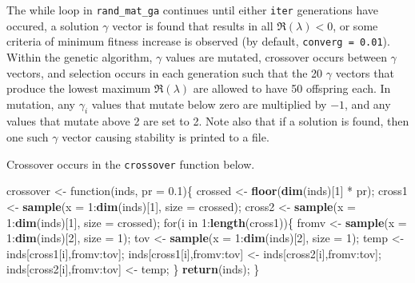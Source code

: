 \documentclass[]{article}
\newenvironment{Shaded}{\begin{snugshade}}{\end{snugshade}}
\newcommand{\KeywordTok}[1]{\textcolor[rgb]{0.13,0.29,0.53}{\textbf{{#1}}}}
\newcommand{\DataTypeTok}[1]{\textcolor[rgb]{0.13,0.29,0.53}{{#1}}}
\newcommand{\DecValTok}[1]{\textcolor[rgb]{0.00,0.00,0.81}{{#1}}}
\newcommand{\FloatTok}[1]{\textcolor[rgb]{0.00,0.00,0.81}{{#1}}}
\newcommand{\StringTok}[1]{\textcolor[rgb]{0.31,0.60,0.02}{{#1}}}
\newcommand{\NormalTok}[1]{{#1}}
\begin{document}
The while loop in \texttt{rand\_mat\_ga} continues until either
\texttt{iter} generations have occured, a solution \(\gamma\) vector is
found that results in all \(\Re(\lambda) < 0\), or some criteria of
minimum fitness increase is observed (by default,
\texttt{converg\ =\ 0.01}). Within the genetic algorithm, \(\gamma\)
values are mutated, crossover occurs between \(\gamma\) vectors, and
selection occurs in each generation such that the 20 \(\gamma\) vectors
that produce the lowest maximum \(\Re(\lambda)\) are allowed to have 50
offspring each. In mutation, any \(\gamma_{i}\) values that mutate below
zero are multiplied by \(-1\), and any values that mutate above 2 are
set to 2. Note also that if a solution is found, then one such
\(\gamma\) vector causing stability is printed to a file.

Crossover occurs in the \texttt{crossover} function below.

\begin{Shaded}
\begin{Highlighting}[]
\NormalTok{crossover <-}\StringTok{ }\NormalTok{function(inds, }\DataTypeTok{pr =} \FloatTok{0.1}\NormalTok{)\{}
    \NormalTok{crossed <-}\StringTok{ }\KeywordTok{floor}\NormalTok{(}\KeywordTok{dim}\NormalTok{(inds)[}\DecValTok{1}\NormalTok{] *}\StringTok{ }\NormalTok{pr);}
    \NormalTok{cross1  <-}\StringTok{ }\KeywordTok{sample}\NormalTok{(}\DataTypeTok{x =} \DecValTok{1}\NormalTok{:}\KeywordTok{dim}\NormalTok{(inds)[}\DecValTok{1}\NormalTok{], }\DataTypeTok{size =} \NormalTok{crossed);}
    \NormalTok{cross2  <-}\StringTok{ }\KeywordTok{sample}\NormalTok{(}\DataTypeTok{x =} \DecValTok{1}\NormalTok{:}\KeywordTok{dim}\NormalTok{(inds)[}\DecValTok{1}\NormalTok{], }\DataTypeTok{size =} \NormalTok{crossed);}
    \NormalTok{for(i in }\DecValTok{1}\NormalTok{:}\KeywordTok{length}\NormalTok{(cross1))\{}
        \NormalTok{fromv   <-}\StringTok{ }\KeywordTok{sample}\NormalTok{(}\DataTypeTok{x =} \DecValTok{1}\NormalTok{:}\KeywordTok{dim}\NormalTok{(inds)[}\DecValTok{2}\NormalTok{], }\DataTypeTok{size =} \DecValTok{1}\NormalTok{);}
        \NormalTok{tov     <-}\StringTok{ }\KeywordTok{sample}\NormalTok{(}\DataTypeTok{x =} \DecValTok{1}\NormalTok{:}\KeywordTok{dim}\NormalTok{(inds)[}\DecValTok{2}\NormalTok{], }\DataTypeTok{size =} \DecValTok{1}\NormalTok{);}
        \NormalTok{temp                   <-}\StringTok{ }\NormalTok{inds[cross1[i],fromv:tov];}
        \NormalTok{inds[cross1[i],fromv:tov] <-}\StringTok{ }\NormalTok{inds[cross2[i],fromv:tov];}
        \NormalTok{inds[cross2[i],fromv:tov] <-}\StringTok{ }\NormalTok{temp;}
    \NormalTok{\}}
    \KeywordTok{return}\NormalTok{(inds);}
\NormalTok{\}}
\end{Highlighting}
\end{Shaded}
\end{document}
